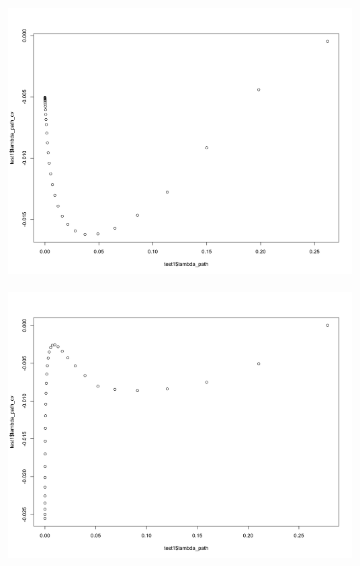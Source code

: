 \documentclass[letterpaper]{article}
\begin{document}
\begin{figure}[H]
\centering
\begin{subfigure}{0.5\textwidth}
  \centering
  \includegraphics[width=1\linewidth]{./result_plot/fix_k/1wrong_path_plot}
\end{subfigure}%
\begin{subfigure}{.5\textwidth}
  \centering
  \includegraphics[width=1\linewidth]{./result_plot/fix_k/2wrong_path_plot}
\end{subfigure}

\end{figure}
\end{document}
